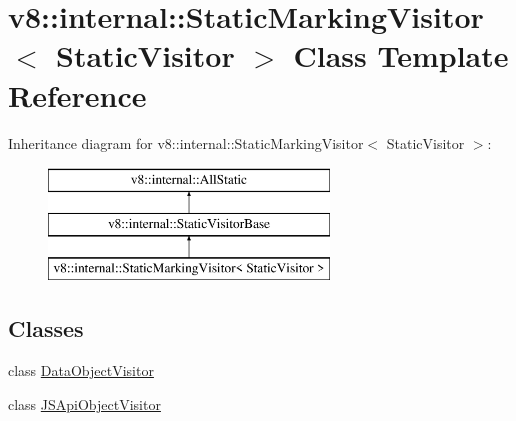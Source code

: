 \hypertarget{classv8_1_1internal_1_1_static_marking_visitor}{}\section{v8\+:\+:internal\+:\+:Static\+Marking\+Visitor$<$ Static\+Visitor $>$ Class Template Reference}
\label{classv8_1_1internal_1_1_static_marking_visitor}
Inheritance diagram for v8\+:\+:internal\+:\+:Static\+Marking\+Visitor$<$ Static\+Visitor $>$\+:\begin{figure}[H]
\begin{center}
\leavevmode
\includegraphics[height=3.000000cm]{classv8_1_1internal_1_1_static_marking_visitor}
\end{center}
\end{figure}
\subsection*{Classes}
\begin{DoxyCompactItemize}
\item 
class \hyperlink{classv8_1_1internal_1_1_static_marking_visitor_1_1_data_object_visitor}{Data\+Object\+Visitor}
\item 
class \hyperlink{classv8_1_1internal_1_1_static_marking_visitor_1_1_j_s_api_object_visitor}{J\+S\+Api\+Object\+Visitor}
\end{DoxyCompactItemize}

